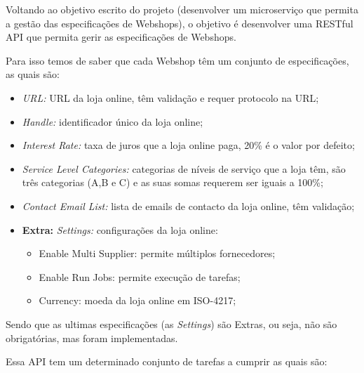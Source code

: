 Voltando ao objetivo escrito do projeto (desenvolver um microserviço que permita a gestão das especificações de Webshops), o objetivo é desenvolver uma RESTful API que permita gerir as especificações de Webshops.

Para isso temos de saber que cada Webshop têm um conjunto de especificações, as quais são:

\begin{itemize}
  \item \textit{URL:} URL da loja online, têm validação e requer protocolo na URL;
  \item \textit{Handle:} identificador único da loja online;
  \item \textit{Interest Rate:} taxa de juros que a loja online paga, 20\% é o valor por defeito;
  \item \textit{Service Level Categories:} categorias de níveis de serviço que a loja têm, são três categorias (A,B e C) e as suas somas requerem ser iguais a 100\%;
  \item \textit{Contact Email List:} lista de emails de contacto da loja online, têm validação;
  \item \textbf{Extra:} \textit{Settings:} configurações da loja online:
        \begin{itemize}
          \item Enable Multi Supplier: permite múltiplos fornecedores;
          \item Enable Run Jobs: permite execução de tarefas;
          \item Currency: moeda da loja online em ISO-4217;
        \end{itemize}
\end{itemize}

Sendo que as ultimas especificações (as \textit{Settings}) são Extras, ou seja, não são obrigatórias, mas foram implementadas.
\newpage

Essa API tem um determinado conjunto de tarefas a cumprir as quais são:

